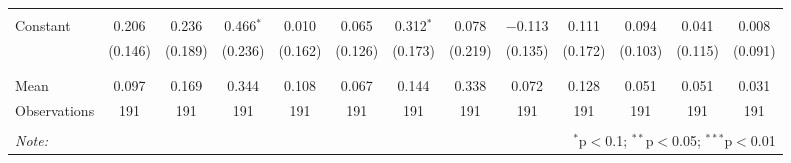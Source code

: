 \begin{tabular}{@{\extracolsep{5pt}}lcccccccccccc}
  & & & & & & & & & & & & \\ 
 Constant & 0.206 & 0.236 & 0.466$^{*}$ & 0.010 & 0.065 & 0.312$^{*}$ & 0.078 & $-$0.113 & 0.111 & 0.094 & 0.041 & 0.008 \\ 
  & (0.146) & (0.189) & (0.236) & (0.162) & (0.126) & (0.173) & (0.219) & (0.135) & (0.172) & (0.103) & (0.115) & (0.091) \\ 
  & & & & & & & & & & & & \\ 
\hline \\[-1.8ex] 
Mean & 0.097 & 0.169 & 0.344 & 0.108 & 0.067 & 0.144 & 0.338 & 0.072 & 0.128 & 0.051 & 0.051 & 0.031 \\ 
Observations & 191 & 191 & 191 & 191 & 191 & 191 & 191 & 191 & 191 & 191 & 191 & 191 \\ 
\hline 
\hline \\[-1.8ex] 
\textit{Note:}  & \multicolumn{12}{r}{$^{*}$p$<$0.1; $^{**}$p$<$0.05; $^{***}$p$<$0.01} \\ 
\end{tabular} 
